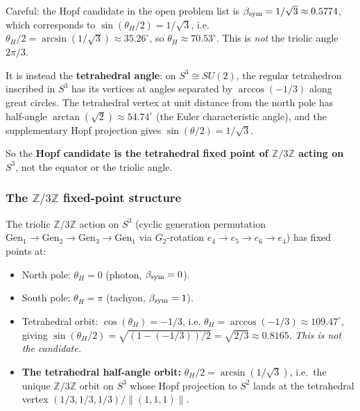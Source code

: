 \begin{remark}
\label{rem:hopf-candidate-fix}
Careful: the Hopf candidate in the open problem list is
$\beta_{\mathrm{sym}} = 1/\sqrt{3} \approx 0.5774$, which corresponds to
$\sin(\theta_H/2) = 1/\sqrt{3}$, i.e. $\theta_H/2 = \arcsin(1/\sqrt{3}) \approx 35.26^\circ$,
so $\theta_H \approx 70.53^\circ$.
This is \emph{not} the triolic angle $2\pi/3$.

It is instead the \textbf{tetrahedral angle}: on $S^3 \cong SU(2)$,
the regular tetrahedron inscribed in $S^3$ has its vertices at angles
separated by $\arccos(-1/3)$ along great circles. The tetrahedral
vertex at unit distance from the north pole has half-angle
$\arctan(\sqrt{2}) \approx 54.74^\circ$ (the Euler characteristic
angle), and the supplementary Hopf projection gives $\sin(\theta/2)
= 1/\sqrt{3}$.

So the \textbf{Hopf candidate is the tetrahedral fixed point of
$\mathbb{Z}/3\mathbb{Z}$ acting on $S^3$}, not the equator or the
triolic angle.
\end{remark}

\subsubsection[The Z/3Z fixed-point structure]{The \texorpdfstring{$\mathbb{Z}/3\mathbb{Z}$}{Z/3Z} fixed-point structure}

\begin{proposition}
\label{prop:z3z-orbits}
The triolic $\mathbb{Z}/3\mathbb{Z}$ action on $S^3$ (cyclic
generation permutation $\mathrm{Gen}_1 \to \mathrm{Gen}_2 \to
\mathrm{Gen}_3 \to \mathrm{Gen}_1$ via $G_2$-rotation
$e_4 \to e_5 \to e_6 \to e_4$) has fixed points at:
\begin{itemize}
\item North pole: $\theta_H = 0$ (photon, $\beta_{\mathrm{sym}} = 0$).
\item South pole: $\theta_H = \pi$ (tachyon, $\beta_{\mathrm{sym}} = 1$).
\item Tetrahedral orbit: $\cos(\theta_H) = -1/3$, i.e. $\theta_H = \arccos(-1/3) \approx 109.47^\circ$, giving $\sin(\theta_H/2) = \sqrt{(1 - (-1/3))/2} = \sqrt{2/3} \approx 0.8165$. \emph{This is not the candidate.}
\item \textbf{The tetrahedral half-angle orbit:} $\theta_H/2 =
  \arcsin(1/\sqrt{3})$, i.e.\ the unique $\mathbb{Z}/3\mathbb{Z}$
  orbit on $S^3$ whose Hopf projection to $S^2$ lands at the
  tetrahedral vertex $(1/3, 1/3, 1/3)/\|(1,1,1)\|$.
\end{itemize}
\end{proposition}

